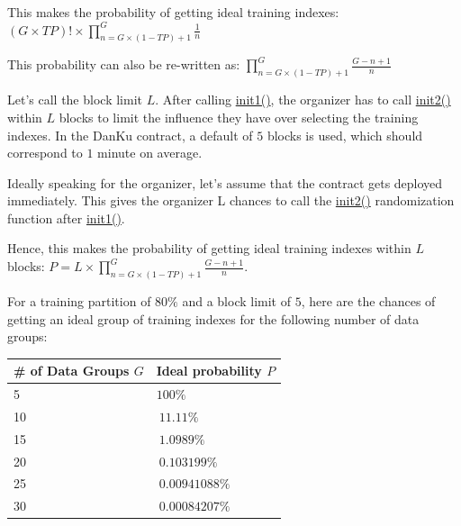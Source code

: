 \documentclass{article}
\begin{document}
\begin{flushleft}
  This makes the probability of getting ideal training indexes: $(G\times TP)!\times \prod\limits_{n=G\times (1-TP) +1}^{G} \frac{1}{n}$
\end{flushleft}

\begin{flushleft}
  This probability can also be re-written as: $\prod\limits_{n=G\times (1-TP) +1}^{G} \frac{G-n+1}{n}$
\end{flushleft}

\begin{flushleft}
Let’s call the block limit $L$. After calling \underline{init1()}, the organizer has to call \underline{init2()} within $L$ blocks to limit the influence they have over selecting the training indexes. In the DanKu contract, a default of $5$ blocks is used, which should correspond to $1$ minute on average.
\end{flushleft}

Ideally speaking for the organizer, let’s assume that the contract gets deployed immediately. This gives the organizer L chances to call the \underline{init2()} randomization function after \underline{init1()}.

\begin{flushleft}
Hence, this makes the probability of getting ideal training indexes within $L$ blocks: $P = L\times \prod\limits_{n=G\times (1-TP) +1}^{G} \frac{G-n+1}{n}$.
\end{flushleft}

\begin{flushleft}
For a training partition of $80\%$ and a block limit of $5$, here are the chances of getting an ideal group of training indexes for the following number of data groups:
\end{flushleft}


\begin{center}
  \begin{tabular}{ | l | l | }
    \hline
    \# of Data Groups $G$ & Ideal probability $P$ \\ \hline
    5 & $100\%$ \\ \hline
    10 & $~11.11\%$ \\ \hline
    15 & $~1.0989\%$ \\ \hline
    20 & $~0.103199\%$ \\ \hline
    25 & $~0.00941088\%$ \\ \hline
    30 & $~0.00084207\%$ \\
    \hline
  \end{tabular}
\end{center}
\end{document}

